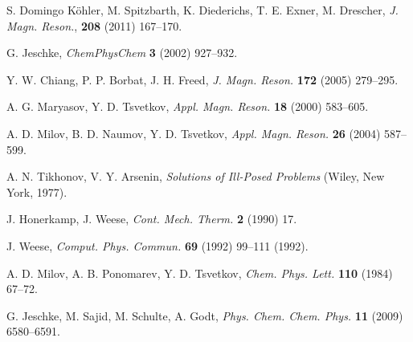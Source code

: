 \documentclass{article}
\begin{document}
\begin{thebibliography}{00}
S. Domingo K\"ohler, M. Spitzbarth, K. Diederichs, T. E. Exner, M. Drescher,
{\em J. Magn. Reson.}, {\bf 208} (2011) 167--170.

G. Jeschke,
{\em ChemPhysChem} {\bf 3} (2002) 927--932.

Y. W. Chiang, P. P. Borbat, J. H. Freed,
{\em J. Magn. Reson.} {\bf 172} (2005) 279--295.

A. G. Maryasov, Y. D. Tsvetkov, 
{\em Appl. Magn. Reson.} {\bf 18} (2000) 583--605.

A. D. Milov, B. D. Naumov, Y. D. Tsvetkov,
{\em Appl. Magn. Reson.} {\bf 26} (2004) 587--599.

A. N. Tikhonov, V. Y. Arsenin, 
{\em Solutions of Ill-Posed Problems} (Wiley, New York, 1977).

J. Honerkamp, J. Weese,
{\em Cont. Mech. Therm.} {\bf 2} (1990) 17.

J. Weese,
{\em Comput. Phys. Commun.} {\bf 69} (1992) 99--111 (1992).

A. D. Milov, A. B. Ponomarev, Y. D. Tsvetkov,
{\em Chem. Phys. Lett.} {\bf 110} (1984) 67--72.

G. Jeschke, M. Sajid, M. Schulte, A. Godt,
{\em Phys. Chem. Chem. Phys.} {\bf 11} (2009) 6580--6591.

\end{thebibliography}
\end{document}
